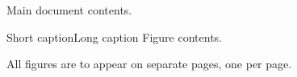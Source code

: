 \documentclass{scrartcl}
\begin{document}
      Main document contents.
      
      \begin{richfigure}{Short caption}{Long caption}{\label{fig:1}}
        Figure contents.
      \end{richfigure}
      
      All figures are to appear on separate pages, one per page.
    
\end{document}
